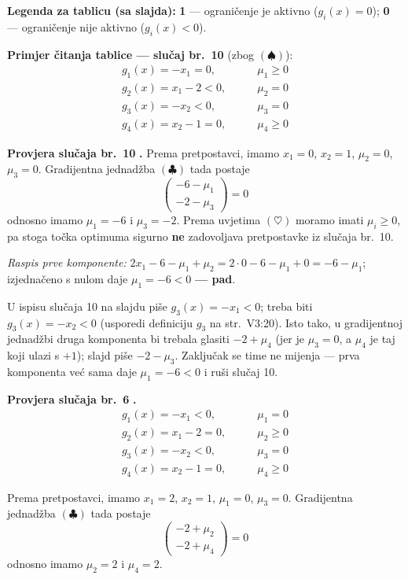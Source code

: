 \begin{zadatak}
\textbf{Legenda za tablicu (sa slajda):} \textbf{1} --- ograničenje je aktivno
($g_i(x) = 0$); \textbf{0} --- ograničenje nije aktivno ($g_i(x) < 0$).

\textbf{Primjer čitanja tablice --- slučaj br.\ 10} (zbog $(\spadesuit)$):
\[
\begin{aligned}
g_1(x) = -x_1 = 0, &\qquad \mu_1 \ge 0 \\
g_2(x) = x_1 - 2 < 0, &\qquad \mu_2 = 0 \\
g_3(x) = -x_2 < 0, &\qquad \mu_3 = 0 \\
g_4(x) = x_2 - 1 = 0, &\qquad \mu_4 \ge 0
\end{aligned}
\]

\textbf{Provjera slučaja br.\ 10} \textbf{.} Prema pretpostavci,
imamo $x_1 = 0$, $x_2 = 1$, $\mu_2 = 0$, $\mu_3 = 0$. Gradijentna jednadžba
$(\clubsuit)$ tada postaje
\[
\begin{pmatrix} -6 - \mu_1 \\ -2 - \mu_3 \end{pmatrix} = 0
\]
odnosno imamo $\mu_1 = -6$ i $\mu_3 = -2$. Prema uvjetima $(\heartsuit)$ moramo
imati $\mu_i \ge 0$, pa stoga točka optimuma sigurno \textbf{ne} zadovoljava
pretpostavke iz slučaja br.\ 10.

\emph{Raspis prve komponente:} $2x_1 - 6 - \mu_1 + \mu_2 = 2\cdot0 - 6 - \mu_1
+ 0 = -6 - \mu_1$; izjednačeno s nulom daje $\mu_1 = -6 < 0$ \textbf{--- pad}.

\begin{napomena}
U ispisu slučaja 10 na slajdu piše $g_3(x) = -x_1 < 0$; treba biti
$g_3(x) = -x_2 < 0$ (usporedi definiciju $g_3$ na str.\ V3:20). Isto tako, u
gradijentnoj jednadžbi druga komponenta bi trebala glasiti $-2 + \mu_4$ (jer je
$\mu_3 = 0$, a $\mu_4$ je taj koji ulazi s $+1$); slajd piše $-2 - \mu_3$.
Zaključak se time ne mijenja --- prva komponenta već sama daje $\mu_1 = -6 < 0$
i ruši slučaj 10.
\end{napomena}

\textbf{Provjera slučaja br.\ 6} \textbf{.}
\[
\begin{aligned}
g_1(x) = -x_1 < 0, &\qquad \mu_1 = 0 \\
g_2(x) = x_1 - 2 = 0, &\qquad \mu_2 \ge 0 \\
g_3(x) = -x_2 < 0, &\qquad \mu_3 = 0 \\
g_4(x) = x_2 - 1 = 0, &\qquad \mu_4 \ge 0
\end{aligned}
\]

Prema pretpostavci, imamo $x_1 = 2$, $x_2 = 1$, $\mu_1 = 0$, $\mu_3 = 0$.
Gradijentna jednadžba $(\clubsuit)$ tada postaje
\[
\begin{pmatrix} -2 + \mu_2 \\ -2 + \mu_4 \end{pmatrix} = 0
\]
odnosno imamo $\mu_2 = 2$ i $\mu_4 = 2$.


\end{zadatak}
